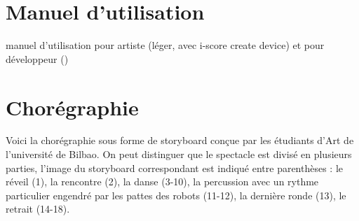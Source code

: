 \section{Manuel d'utilisation}
manuel d'utilisation pour artiste (léger, avec i-score create device) et pour développeur () 

\section{Chorégraphie}
Voici la chorégraphie sous forme de storyboard conçue par les étudiants d'Art de l'université de Bilbao. On peut distinguer que le spectacle est divisé en plusieurs parties, l'image du storyboard correspondant est indiqué entre parenthèses : le réveil (1), la rencontre (2), la danse (3-10), la percussion avec un rythme particulier engendré par les pattes des robots (11-12), la dernière ronde (13), le retrait (14-18).

\hspace*{-2cm}

